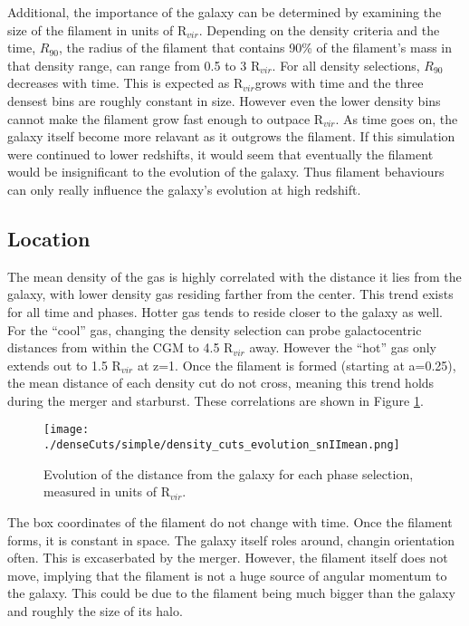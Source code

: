 \documentclass{article}
\newcommand{\rvir}{R$_{vir}$}
\begin{document}
Additional, the importance of the galaxy can be determined by examining the size
of the filament in units of R$_{vir}$. Depending on the density criteria and the
time, $R_{90}$, the radius of the filament that contains 90\% of the filament's
mass in that density range, can range from 0.5 to 3 \rvir.  For all density
selections, $R_{90}$ decreases with time. This is expected as \rvir grows with
time and the three densest bins are roughly constant in size. However even the
lower density bins cannot make the filament grow fast enough to outpace \rvir. As
time goes on, the galaxy itself become more relavant as it outgrows the filament.
If this simulation were continued to lower redshifts, it would seem that
eventually the filament would be insignificant to the evolution of the galaxy.
Thus filament behaviours can only really influence the galaxy's evolution at high
redshift. 


\subsection{Location}
The mean density of the gas is highly correlated with the distance it lies from
the galaxy, with lower density gas residing farther from the center. This trend
exists for all time and phases. Hotter gas tends to reside closer to the galaxy
as well. For the ``cool'' gas, changing the density selection can probe
galactocentric distances from within the CGM to 4.5 R$_{vir}$ away. However the
``hot'' gas only extends out to 1.5 R$_{vir}$ at z=1. Once the filament is formed
(starting at a=0.25), the mean distance of each density cut do not cross, meaning
this trend holds during the merger and starburst. These correlations are shown in
Figure \ref{rModmean}.

\begin{figure}[h!]
\centering
\texttt{[image: ./denseCuts/simple/density\_cuts\_evolution\_snIImean.png]}
\caption{Evolution of the distance from the galaxy for each phase selection,
measured in units of \rvir.}
\label{rModmean}
\end{figure}

The box coordinates of the filament do not change with time. Once the filament
forms, it is constant in space. The galaxy itself roles around, changin
orientation often. This is excaserbated by the merger. However, the filament
itself does not move, implying that the filament is not a huge source of angular
momentum to the galaxy. This could be due to the filament being much bigger than
the galaxy and roughly the size of its halo. 
\end{document}
